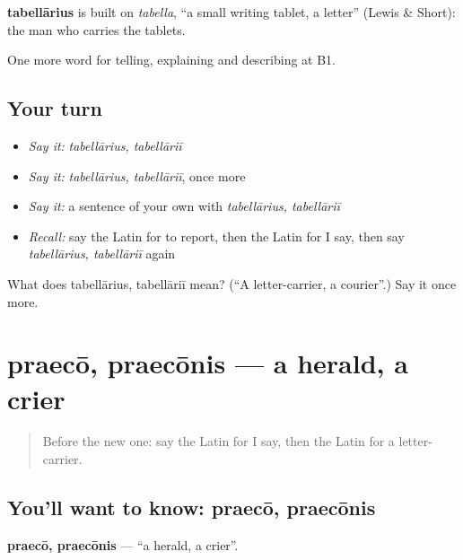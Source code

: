 \begin{cousinweb}
\textbf{tabellārius} is built on \emph{tabella}, \textquotedblleft{}a small writing tablet, a letter\textquotedblright{} (Lewis \& Short): the man who carries the tablets.
\end{cousinweb}

\begin{grammarlens}[title={What you've built}]
One more word for telling, explaining and describing at B1.
\end{grammarlens}

\subsection*{Your turn}
\begin{itemize}
\raggedright
  \item \emph{Say it:} \emph{tabellārius, tabellāriī}
  \item \emph{Say it:} \emph{tabellārius, tabellāriī}, once more
  \item \emph{Say it:} a sentence of your own with \emph{tabellārius, tabellāriī}
  \item \emph{Recall:} say the Latin for to report, then the Latin for I say, then say \emph{tabellārius, tabellāriī} again
\end{itemize}

\begin{tcolorbox}[breakable,colback=teal!4,colframe=teal!35!black,title={Before you move on}]
What does tabellārius, tabellāriī mean? (\textquotedblleft{}A letter-carrier, a courier\textquotedblright{}.) Say it once more.
\end{tcolorbox}
\section[praecō, praecōnis]{praecō, praecōnis — a herald, a crier}

\label{lesson:LA-C300-praeco}



\begin{quote}
Before the new one: say the Latin for I say, then the Latin for a letter-carrier.
\end{quote}

\subsection*{You'll want to know: praecō, praecōnis}
\textbf{praecō, praecōnis} — \textquotedblleft{}a herald, a crier\textquotedblright{}.

